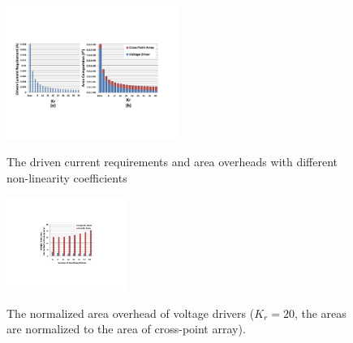 %
\begin{figure}%
\centering
  \includegraphics[width=0.5\textwidth]{./figures/area_all.pdf}\\
  \vspace{-5pt}
  \caption{The driven current requirements and area overheads with different non-linearity coefficients}\label{fig:area_all}
 \vspace{-15pt}
\end{figure}


\begin{figure}%
\centering
  \includegraphics[width=0.35\textwidth]{./figures/Area_kr20_f.pdf}\\
  \caption{The normalized area overhead of voltage drivers ($K_r=20$, the areas are normalized to the area of cross-point array). }\label{fig:Area_kr20}
\end{figure}
